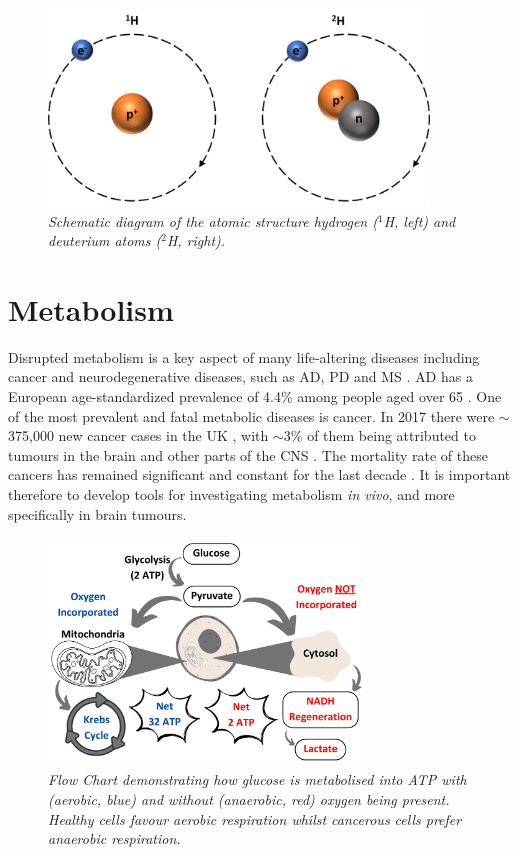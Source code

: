 \begin{figure}
    \centering
    \includegraphics[width=0.9\textwidth]{Figures/Intro/1H2H.png}
    \caption{\textit{Schematic diagram of the atomic structure hydrogen ($^1$H, left) and deuterium atoms ($^2$H, right).}}
    \label{fig:intro:1H2H}
\end{figure}

\section{Metabolism}

Disrupted metabolism is a key aspect of many life-altering diseases including cancer and neurodegenerative diseases, such as \ac{AD}, \ac{PD} and \ac{MS} \cite{Gialleonardo2016TheImaging}. \ac{AD} has a European age-standardized prevalence of 4.4\% among people aged over 65 \cite{Qiu2009EpidemiologyIntervention}. One of the most prevalent and fatal metabolic diseases is cancer. In 2017 there were $\sim$375,000 new cancer cases in the UK \cite{CancerUK}, with $\sim$3\% of them being attributed to tumours in the brain and other parts of the CNS \cite{BrainUK}. The mortality rate of these cancers has remained significant and constant for the last decade \cite{BrainUK}. It is important therefore to develop tools for investigating metabolism \textit{in vivo}, and more specifically in brain tumours.

\begin{figure}
    \centering
    \includegraphics[width=0.75\textwidth]{Figures/Intro/Metabolism.png}
    \caption{\textit{Flow Chart demonstrating how glucose is metabolised into \ac{ATP} with (aerobic, blue) and without (anaerobic, red) oxygen being present. Healthy cells favour aerobic respiration whilst cancerous cells prefer anaerobic respiration.}}
    \label{fig:intro:Metabolism}
\end{figure}

